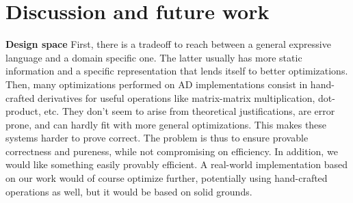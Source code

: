 \section{Discussion and future work} %
\label{sec:discussion_and_future_work}

\noindent \textbf{Design space}
First, there is a tradeoff to reach between a general expressive language and a domain specific one. The latter usually has more static information and a specific representation that lends itself to better optimizations.
Then, many optimizations performed on AD implementations consist in hand-crafted derivatives for useful operations like matrix-matrix multiplication, dot-product, etc.
They don't seem to arise from theoretical justifications, are error prone, and can hardly fit with more general optimizations.
This makes these systems harder to prove correct. The problem is thus to ensure provable correctness and pureness, while not compromising on efficiency. In addition, we would like something easily provably efficient. 
A real-world implementation based on our work would of course optimize further, potentially using hand-crafted operations as well, but it would be based on solid grounds.




